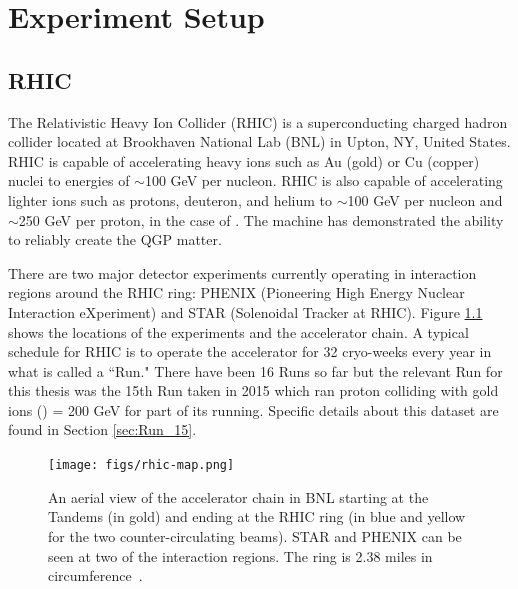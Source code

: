 \chapter{Experiment Setup}
\section{RHIC}
The Relativistic Heavy Ion Collider (RHIC) is a superconducting charged hadron collider located at Brookhaven National Lab (BNL) in Upton, NY, United States. RHIC is capable of accelerating heavy ions such as Au (gold) or Cu (copper) nuclei to energies of $\sim$100 GeV per nucleon. RHIC is also capable of accelerating lighter ions such as protons, deuteron, and helium to $\sim	$100 GeV per nucleon and $\sim$250 GeV per proton, in the case of \pp. The machine has demonstrated the ability to reliably create the QGP matter.

There are two major detector experiments currently operating in interaction regions around the RHIC ring: PHENIX (Pioneering High Energy Nuclear Interaction eXperiment) and STAR (Solenoidal Tracker at RHIC). Figure \ref{fig:rhic_heli_photo} shows the locations of the experiments and the accelerator chain. A typical schedule for RHIC is to operate the accelerator for 32 cryo-weeks every year in what is called a ``Run." There have been 16 Runs so far but the relevant Run for this thesis was the 15th Run taken in 2015 which ran proton colliding with gold ions (\pau) \sqsn = 200 GeV for part of its running. Specific details about this dataset are found in Section \ref{sec:Run_15}.

\begin{figure}[!ht]
\centering
\texttt{[image: figs/rhic-map.png]}
\caption{An aerial view of the accelerator chain in BNL starting at the Tandems (in gold) and ending at the RHIC ring (in blue and yellow for the two counter-circulating beams). STAR and PHENIX can be seen at two of the interaction regions. The ring is 2.38 miles in circumference~\cite{Tannenbaum:2013wkn}.}
\label{fig:rhic_heli_photo}
\end{figure}

